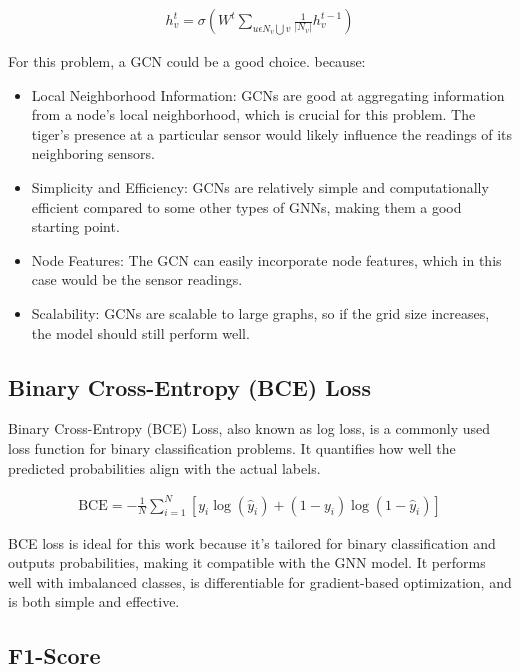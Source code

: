 \documentclass{article}
\begin{document}
\begin{align}
  h_{v}^{t}=\sigma \left ( 
    W^t
    \sum_{u\epsilon N_v\bigcup v}
    \frac{1}{\left | N_v \right |} 
    h_{v}^{t-1}
    \right )
\end{align}

For this problem, a GCN could be a good choice. because:

  \begin{itemize}
    \item Local Neighborhood Information: GCNs are good at aggregating information from a node's local neighborhood, which is crucial for this problem. The tiger's presence at a particular sensor would likely influence the readings of its neighboring sensors.
  
    \item Simplicity and Efficiency: GCNs are relatively simple and computationally efficient compared to some other types of GNNs, making them a good starting point.
  
    \item Node Features: The GCN can easily incorporate node features, which in this case would be the sensor readings.
  
    \item Scalability: GCNs are scalable to large graphs, so if the grid size increases, the model should still perform well.
  \end{itemize}

\subsection{Binary Cross-Entropy (BCE) Loss}
\label{ssec:bce}

Binary Cross-Entropy (BCE)\cite{domingos2012few}  Loss, also known as log loss, is a commonly used loss function for binary classification problems. It quantifies how well the predicted probabilities align with the actual labels.

\begin{align}
  \text{BCE} = -\frac{1}{N} \sum_{i=1}^{N} [y_i \log(\hat{y}_i) + (1 - y_i) \log(1 - \hat{y}_i)]
\end{align}

BCE loss is ideal for this work because it's tailored for binary classification and outputs probabilities, making it compatible with the GNN model. It performs well with imbalanced classes, is differentiable for gradient-based optimization, and is both simple and effective.

\subsection{F1-Score}
\label{ssec:f1}
\end{document}

